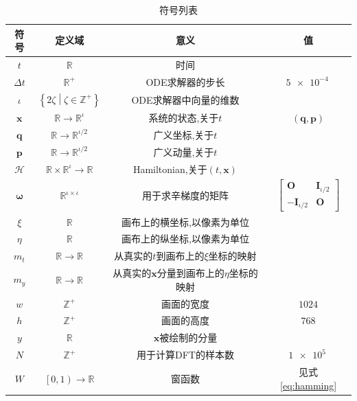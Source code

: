 \documentclass[12pt]{article}
\begin{document}
\begin{table}[h]
  \caption{符号列表}
  \label{tab:symbols}
  \centering
  \begin{tabular}{cccc}
    符号 & 定义域 & 意义 & 值\\
    \hline
    $t$ & $\mathbb R$ & 时间\\
    $\Delta t$ & $\mathbb R^+$ & ODE求解器的步长 & $\SI{5e-4}{}$\\
    $\iota$ & $\left\{2\zeta\middle|\zeta\in\mathbb Z^+\right\}$ & ODE求解器中向量的维数\\
    $\mathbf x$ & $\mathbb R\rightarrow\mathbb R^\iota$ & 系统的状态,关于$t$ & $\left(\mathbf q,\mathbf p\right)$\\
    $\mathbf q$ & $\mathbb R\rightarrow\mathbb R^{\iota/2}$ & 广义坐标,关于$t$\\
    $\mathbf p$ & $\mathbb R\rightarrow\mathbb R^{\iota/2}$ & 广义动量,关于$t$\\
    $\mathcal H$ & $\mathbb R\times\mathbb R^\iota\rightarrow\mathbb R$ & Hamiltonian,关于$\left(t,\mathbf x\right)$\\
    $\boldsymbol\omega$ & $\mathbb R^{\iota\times\iota}$ & 用于求辛梯度的矩阵 & $\left[\begin{matrix}
      \mathbf O & \mathbf I_{\iota/2}\\
      -\mathbf I_{\iota/2} & \mathbf O
    \end{matrix}\right]$\\
    $\xi$ & $\mathbb R$ & 画布上的横坐标,以像素为单位\\
    $\eta$ & $\mathbb R$ & 画布上的纵坐标,以像素为单位\\
    $m_t$ & $\mathbb R\rightarrow\mathbb R$ & 从真实的$t$到画布上的$\xi$坐标的映射\\
    $m_y$ & $\mathbb R\rightarrow\mathbb R$ & 从真实的$\mathbf x$分量到画布上的$\eta$坐标的映射\\
    $w$ & $\mathbb Z^+$ & 画面的宽度 & $1024$\\
    $h$ & $\mathbb Z^+$ & 画面的高度 & $768$\\
    $y$ & $\mathbb R$ & $\mathbf x$被绘制的分量\\
    $N$ & $\mathbb Z^+$ & 用于计算DFT的样本数 & $\SI{1e5}{}$\\
    $W$ & $\left[0,1\right)\rightarrow\mathbb R$ & 窗函数 & 见式 \ref{eq:hamming}
  \end{tabular}
\end{table}
\end{document}
